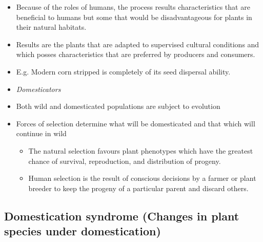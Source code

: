 \documentclass[ignorenonframetext,aspectratio=169]{beamer}
\providecommand{\tightlist}{%
  \setlength{\itemsep}{0pt}\setlength{\parskip}{0pt}}
\begin{document}
\begin{frame}{}
\protect\hypertarget{section-2}{}

\begin{itemize}
\tightlist
\item
  Because of the roles of humans, the process results characteristics
  that are beneficial to humans but some that would be disadvantageous
  for plants in their natural habitats.
\item
  Results are the plants that are adapted to supervised cultural
  conditions and which posses characteristics that are preferred by
  producers and consumers.
\item
  E.g. Modern corn stripped is completely of its seed dispersal ability.
\item
  \emph{Domesticators}
\item
  Both wild and domesticated populations are subject to evolution
\item
  Forces of selection determine what will be domesticated and that which
  will continue in wild

  \begin{itemize}
  \tightlist
  \item
    The natural selection favours plant phenotypes which have the
    greatest chance of survival, reproduction, and distribution of
    progeny.
  \item
    Human selection is the result of conscious decisions by a farmer or
    plant breeder to keep the progeny of a particular parent and discard
    others.
  \end{itemize}
\end{itemize}

\end{frame}

\hypertarget{domestication-syndrome-changes-in-plant-species-under-domestication}{%
\subsection{Domestication syndrome (Changes in plant species under
domestication)}\label{domestication-syndrome-changes-in-plant-species-under-domestication}}
\end{document}
